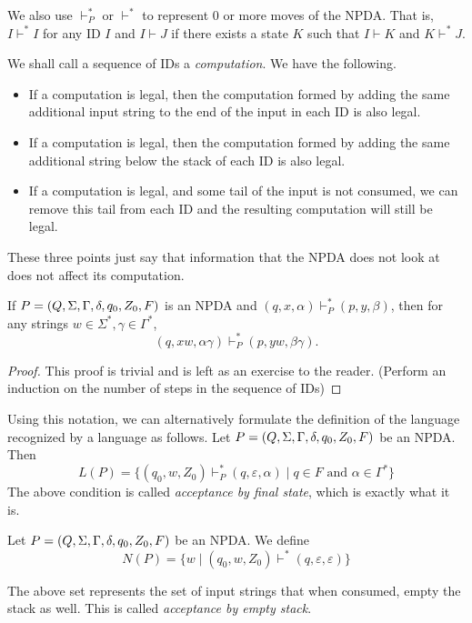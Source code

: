 We also use $\vdash^*_P$ or $\vdash^*$ to represent $0$ or more moves of the NPDA. That is, $I\vdash^* I$ for any ID $I$ and $I\vdash J$ if there exists a state $K$ such that $I\vdash K$ and $K\vdash^* J$.

\vspace{3mm}
We shall call a sequence of IDs a \textit{computation}. We have the following.
\begin{itemize}
    \item If a computation is legal, then the computation formed by adding the same additional input string to the end of the input in each ID is also legal.
    \item If a computation is legal, then the computation formed by adding the same additional string below the stack of each ID is also legal.
    \item If a computation is legal, and some tail of the input is not consumed, we can remove this tail from each ID and the resulting computation will still be legal.
\end{itemize}

These three points just say that information that the NPDA does not look at does not affect its computation.

\begin{theorem}
\label{dontreaddontcare}
If $P=(Q,\Sigma,\Gamma,\delta,q_0,Z_0,F)$ is an NPDA and $(q,x,\alpha)\vdash^*_P(p,y,\beta)$, then for any strings $w\in\Sigma^*, \gamma\in\Gamma^*$, $$(q,xw,\alpha\gamma)\vdash^*_P(p,yw,\beta\gamma).$$
\end{theorem}
\begin{proof}
This proof is trivial and is left as an exercise to the reader. (Perform an induction on the number of steps in the sequence of IDs)
\end{proof}

Using this notation, we can alternatively formulate the definition of the language recognized by a language as follows.
Let $P=(Q,\Sigma,\Gamma,\delta,q_0,Z_0,F)$ be an NPDA. Then
$$L(P)=\{(q_0,w,Z_0)\vdash^*_P(q,\varepsilon,\alpha)\mid q\in F\text{ and }\alpha\in\Gamma^*\}$$
The above condition is called \textit{acceptance by final state}, which is exactly what it is.
\begin{definition}
Let $P=(Q,\Sigma,\Gamma,\delta,q_0,Z_0,F)$ be an NPDA. We define
$$N(P)=\{w\mid (q_0,w,Z_0)\vdash^*(q,\varepsilon,\varepsilon)\}$$
\end{definition}


The above set represents the set of input strings that when consumed, empty the stack as well. This is called \textit{acceptance by empty stack}.

